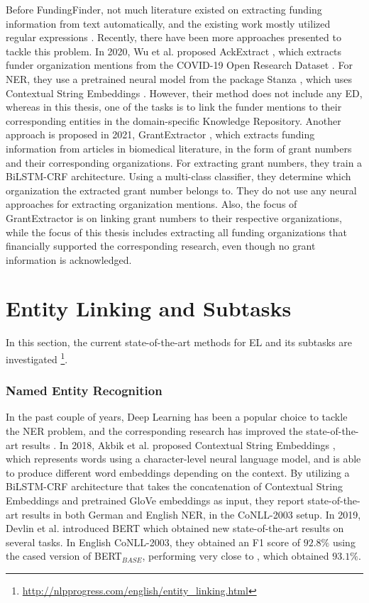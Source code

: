 \documentclass{report}
\theoremstyle{definition}
\theoremstyle{remark}
\begin{document}
    Before FundingFinder, not much literature existed on extracting funding information from text automatically, and the existing work mostly utilized regular expressions \cite{ElsPaper}. Recently, there have been more approaches presented to tackle this problem. In 2020, Wu et al. proposed AckExtract  \cite{AckExtract}, which extracts funder organization mentions from the COVID-19 Open Research Dataset \cite{CORD}. For NER, they use a pretrained neural model from the package Stanza \cite{stanza}, which uses Contextual String Embeddings \cite{flairpaper}. However, their method does not include any ED, whereas in this thesis, one of the tasks is to link the funder mentions to their corresponding entities in the domain-specific Knowledge Repository. Another approach is proposed in 2021, GrantExtractor \cite{GrantExtractor}, which extracts funding information from articles in biomedical literature, in the form of grant numbers and their corresponding organizations. For extracting grant numbers, they train a BiLSTM-CRF \cite{BiLSTMCRF} architecture. Using a multi-class classifier, they determine which organization the extracted grant number belongs to. They do not use any neural approaches for extracting organization mentions. Also, the focus of GrantExtractor is on linking grant numbers to their respective organizations, while the focus of this thesis includes extracting all funding organizations that financially supported the corresponding research, even though no grant information is acknowledged.

\section{Entity Linking and Subtasks}
\label{sota}
In this section, the current state-of-the-art methods for EL and its subtasks are investigated \footnote{\url{http://nlpprogress.com/english/entity_linking.html}}.
\subsubsection{Named Entity Recognition}
In the past couple of years, Deep Learning has been a popular choice to tackle the NER problem, and the corresponding research has improved the state-of-the-art results \cite{NERsurvey}. In 2018, Akbik et al. proposed Contextual String Embeddings \cite{flairpaper}, which represents words using a character-level neural language model, and is able to produce different word embeddings depending on the context. By utilizing a BiLSTM-CRF architecture that takes the concatenation of Contextual String Embeddings and pretrained GloVe embeddings \cite{glove} as input, they report state-of-the-art results in both German and English NER, in the CoNLL-2003 \cite{conll} setup. In 2019, Devlin et al. introduced BERT \cite{BERT} which obtained new state-of-the-art results on several tasks. In English CoNLL-2003, they obtained an F1 score of $92.8\%$ using the cased version of BERT$_{BASE}$\cite{BERT}, performing very close to \cite{flairpaper}, which obtained $93.1\%$.
\end{document}
